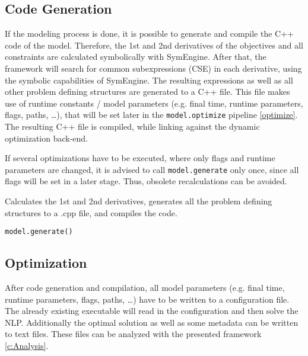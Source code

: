 \documentclass[12pt]{article}
\begin{document}
\subsection{Code Generation}

If the modeling process is done, it is possible to generate and compile the C++
code of the
model.
Therefore, the 1st and 2nd derivatives of the objectives and all constraints
are calculated symbolically with SymEngine. After that, the framework will
search for common subexpressions (CSE) in each derivative, using the symbolic
capabilities of SymEngine. The resulting expressions as well as all other
problem defining structures are generated to a C++ file. This file makes
use of runtime constants / model parameters (e.g. final time, runtime
parameters, flags, paths,
\ldots), that will be set later in the \texttt{model.optimize} pipeline
\eqref{optimize}. The resulting C++ file is
compiled, while linking against the dynamic optimization back-end.

If several optimizations have to be executed, where only flags and runtime
parameters are changed, it is advised to call \texttt{model.generate} only
once, since all flags will be set in a later stage. Thus, obsolete
recalculations can be avoided.

\begin{mdframed}[backgroundcolor=gray!10, roundcorner=10pt,
		linewidth=1pt]

	Calculates the 1st and 2nd derivatives, generates all the problem
	defining structures to a .cpp file, and compiles the code.

	\begin{lstlisting}
model.generate()
\end{lstlisting}

\end{mdframed}

\subsection{Optimization}
After code generation and compilation, all model parameters (e.g. final time,
runtime
parameters, flags, paths, \ldots) have to be written to a configuration file.
The already existing executable will read in the configuration and then solve
the NLP. Additionally the optimal solution
as well as some metadata can be written to text files. These files can be
analyzed with the presented framework \eqref{c:Analysis}.
\end{document}
